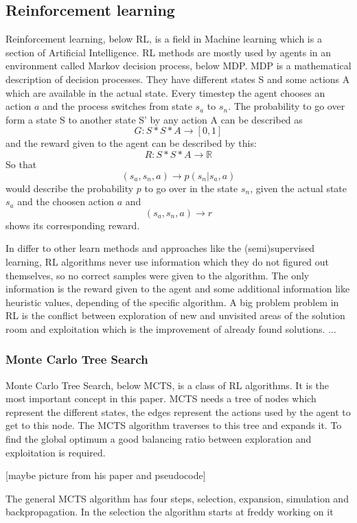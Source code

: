 \subsection{Reinforcement learning} 
 
Reinforcement learning, below RL, is a field in Machine learning which is a section of Artificial Intelligence. RL methods are mostly used by agents in an environment called Markov decision process, below MDP. MDP is a mathematical description of decision processes. They have different states S and some actions A which are available in the actual state. Every timestep the agent chooses an action $a$ and the process switches from state $s_a$ to $s_n$. The probability to go over form a state S to another state S' by any action A can be described as
\[
	G: S*S*A \rightarrow [0,1] 
\] 
and the reward given to the agent can be described by this:
\[
	R: S*S*A \rightarrow \mathbb{R}
\]
So that
\[
	(s_a, s_n, a) \rightarrow p(s_n|s_a, a)
\]
would describe the probability $p$ to go over in the state $s_n$, given the actual state $s_a$ and the choosen action $a$ and 
\[
	(s_a, s_n, a) \rightarrow r
\]
shows its corresponding reward.  


In differ to other learn methods and approaches like the (semi)supervised learning, RL algorithms never use information which they do not figured out themselves, so no correct samples were given to the algorithm. The only information is the reward given to the agent and some additional information like heuristic values, depending of the specific algorithm. 
A big problem problem in RL is the conflict between exploration of new and unvisited areas of the solution room and exploitation which is the improvement of already found solutions.
...
\subsubsection{Monte Carlo Tree Search} 

Monte Carlo Tree Search, below MCTS, is a class of RL algorithms. It is the most important concept in this paper. MCTS needs a tree of nodes which represent the different states, the edges represent the actions used by the agent to get to this node. The MCTS algorithm traverses to this tree and expands it. To find the global optimum a good balancing ratio between exploration and exploitation is required. 

[maybe picture from his paper and pseudocode]

The general MCTS algorithm has four steps, selection, expansion, simulation and backpropagation. In the selection the algorithm starts at  
freddy working on it 

